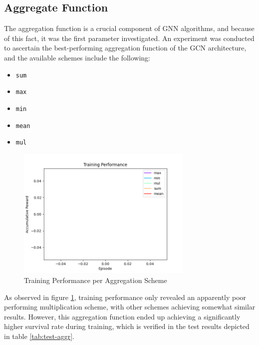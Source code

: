 \subsection{Aggregate Function} \label{sec:results-aggr}

The aggregation function is a crucial component of \ac{GNN} algorithms, and because of this fact, it was the first parameter investigated. An experiment was conducted to ascertain the best-performing aggregation function of the \ac{GCN} architecture, and the available schemes include the following:
\begin{itemize}
	\item \texttt{sum}
	\item \texttt{max}
	\item \texttt{min}
	\item \texttt{mean}
	\item \texttt{mul}
\end{itemize}

\begin{figure}[ht]
	\includegraphics[width=0.75\textwidth]{graphs/aggr/training_performance.png}
	\caption{Training Performance per Aggregation Scheme}
	\label{fig:train-perf-aggr}
\end{figure}

As observed in figure \ref{fig:train-perf-aggr}, training performance  only revealed an apparently poor performing multiplication scheme, with other schemes achieving somewhat similar results. However, this aggregation function ended up achieving a significantly higher survival rate during training, which is verified in the test results depicted in table \ref{tab:test-aggr}. \par

